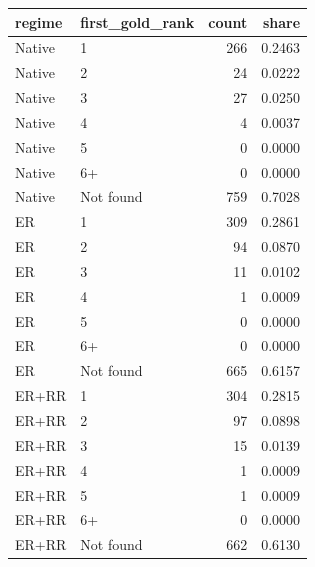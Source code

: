 \begin{tabular}{llrr}
\toprule
regime & first_gold_rank & count & share \\
\midrule
Native & 1 & 266 & 0.2463 \\
Native & 2 & 24 & 0.0222 \\
Native & 3 & 27 & 0.0250 \\
Native & 4 & 4 & 0.0037 \\
Native & 5 & 0 & 0.0000 \\
Native & 6+ & 0 & 0.0000 \\
Native & Not found & 759 & 0.7028 \\
ER & 1 & 309 & 0.2861 \\
ER & 2 & 94 & 0.0870 \\
ER & 3 & 11 & 0.0102 \\
ER & 4 & 1 & 0.0009 \\
ER & 5 & 0 & 0.0000 \\
ER & 6+ & 0 & 0.0000 \\
ER & Not found & 665 & 0.6157 \\
ER+RR & 1 & 304 & 0.2815 \\
ER+RR & 2 & 97 & 0.0898 \\
ER+RR & 3 & 15 & 0.0139 \\
ER+RR & 4 & 1 & 0.0009 \\
ER+RR & 5 & 1 & 0.0009 \\
ER+RR & 6+ & 0 & 0.0000 \\
ER+RR & Not found & 662 & 0.6130 \\
\bottomrule
\end{tabular}
